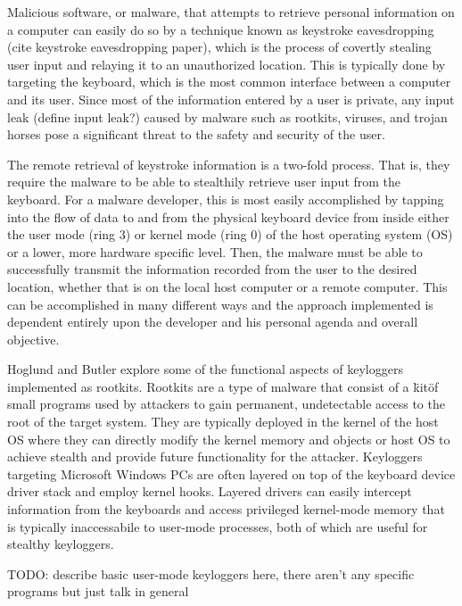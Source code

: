 \documentclass[times, 10pt,twocolumn]{article}
\begin{document}
Malicious software, or malware, that attempts to retrieve personal information on a computer can easily do so by a technique known as keystroke eavesdropping (cite keystroke eavesdropping paper), which is the process of covertly stealing user input and relaying it to an unauthorized location. This is typically done by targeting the keyboard, which is the most common interface between a computer and its user. Since most of the information entered by a user is private, any input leak (define input leak?) caused by malware such as rootkits, viruses, and trojan horses pose a significant threat to the safety and security of the user. 

The remote retrieval of keystroke information is a two-fold process. That is, they require the malware to be able to stealthily retrieve user input from the keyboard. For a malware developer, this is most easily accomplished by tapping into the flow of data to and from the physical keyboard device from inside either the user mode (ring 3) or kernel mode (ring 0) of the host operating system (OS) or a lower, more hardware specific level. Then, the malware must be able to successfully transmit the information recorded from the user to the desired location, whether that is on the local host computer or a remote computer. This can be accomplished in many different ways and the approach implemented is dependent entirely upon the developer and his personal agenda and overall objective. 

Hoglund and Butler \cite{Hoglund05-rootkits} explore some of the functional aspects of keyloggers implemented as rootkits. Rootkits are a type of malware that consist of a \"kit\" of small programs used by attackers to gain permanent, undetectable access to the root of the target system. They are typically deployed in the kernel of the host OS where they can directly modify the kernel memory and objects or host OS to achieve stealth and provide future functionality for the attacker. Keyloggers targeting Microsoft Windows PCs are often layered on top of the keyboard device driver stack and employ kernel hooks. Layered drivers can easily intercept information from the keyboards and access privileged kernel-mode memory that is typically inaccessabile to user-mode processes, both of which are useful for stealthy keyloggers. 

TODO: describe basic user-mode keyloggers here, there aren't any specific programs but just talk in general
\end{document}
